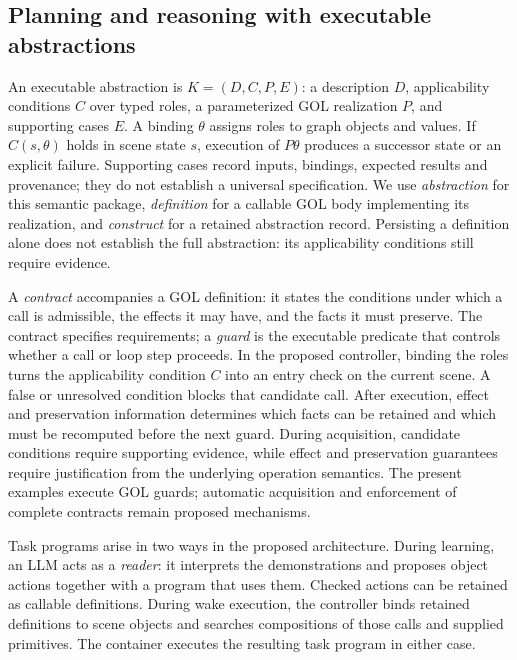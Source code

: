 \documentclass[11pt]{article}
\begin{document}
\subsection{Planning and reasoning with executable abstractions}\label{approach:plans}
An executable abstraction is $K=(D,C,P,E)$: a description $D$, applicability conditions $C$ over typed roles, a parameterized GOL realization $P$, and supporting cases $E$. A binding $\theta$ assigns roles to graph objects and values. If $C(s,\theta)$ holds in scene state $s$, execution of $P\theta$ produces a successor state or an explicit failure. Supporting cases record inputs, bindings, expected results and provenance; they do not establish a universal specification. We use \emph{abstraction} for this semantic package, \emph{definition} for a callable GOL body implementing its realization, and \emph{construct} for a retained abstraction record. Persisting a definition alone does not establish the full abstraction: its applicability conditions still require evidence.

A \emph{contract} accompanies a GOL definition: it states the conditions under which a call is admissible, the effects it may have, and the facts it must preserve. The contract specifies requirements; a \emph{guard} is the executable predicate that controls whether a call or loop step proceeds. In the proposed controller, binding the roles turns the applicability condition $C$ into an entry check on the current scene. A false or unresolved condition blocks that candidate call. After execution, effect and preservation information determines which facts can be retained and which must be recomputed before the next guard. During acquisition, candidate conditions require supporting evidence, while effect and preservation guarantees require justification from the underlying operation semantics. The present examples execute GOL guards; automatic acquisition and enforcement of complete contracts remain proposed mechanisms.

Task programs arise in two ways in the proposed architecture. During learning, an LLM acts as a \emph{reader}: it interprets the demonstrations and proposes object actions together with a program that uses them. Checked actions can be retained as callable definitions. During wake execution, the controller binds retained definitions to scene objects and searches compositions of those calls and supplied primitives. The container executes the resulting task program in either case.
\end{document}
